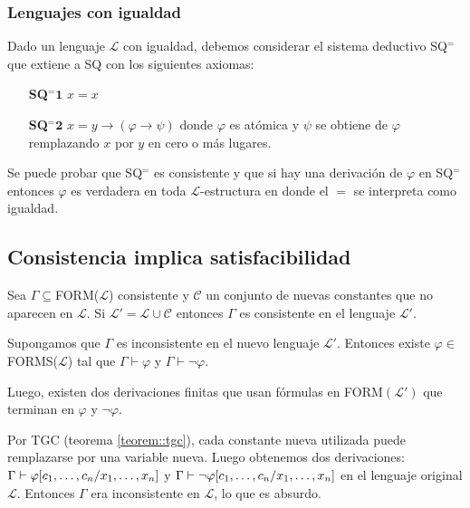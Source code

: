 \subsubsection{Lenguajes con igualdad}
Dado un lenguaje $\mathcal{L}$ con igualdad, debemos considerar el sistema deductivo SQ$^=$ que extiene a SQ con los siguientes axiomas:

\begin{itemize}
	\item[\textbf{SQ}$\bm{^=1}$] $x = x$
	\item[\textbf{SQ}$\bm{^=2}$] $x = y\to(\varphi\to\psi)$ donde $\varphi$ es atómica y $\psi$ se obtiene de $\varphi$ remplazando $x$ por $y$ en cero o más lugares.
\end{itemize}

Se puede probar que SQ$^=$ es consistente y que si hay una derivación de $\varphi$ en SQ$^=$ entonces $\varphi$ es verdadera en toda $\mathcal{L}$-estructura en donde el $=$ se interpreta como igualdad.

\subsection{Consistencia implica satisfacibilidad}

\begin{teorema}
	Sea $\Gamma\subseteq$FORM($\mathcal{L}$) consistente y  $\mathcal{C}$ un conjunto de nuevas constantes que no aparecen en $\mathcal{L}$. Si $\mathcal{L}'=\mathcal{L}\cup\mathcal{C}$ entonces $\Gamma$ es consistente en el lenguaje $\mathcal{L}'$.
\end{teorema}

\begin{demo}
	Supongamos que $\Gamma$ es inconsistente en el nuevo lenguaje $\mathcal{L}'$. Entonces existe $\varphi\in$FORMS($\mathcal{L}$) tal que $\Gamma\vdash\varphi$ y $\Gamma\vdash\lnot\varphi$.
	
	Luego, existen dos derivaciones finitas que usan fórmulas en FORM$(\mathcal{L}')$ que terminan en $\varphi$ y $\lnot\varphi$.
	
	Por TGC (teorema \ref{teorem::tgc}), cada constante nueva utilizada puede remplazarse por una variable nueva. Luego obtenemos dos derivaciones: $\Gamma\vdash\varphi[c_1,\dots, c_{n}/x_1,\dots, x_{n}]$ y $\Gamma\vdash\lnot\varphi[c_1,\dots, c_{n}/x_1,\dots, x_{n}]$ en el lenguaje original $\mathcal{L}$. Entonces $\Gamma$ era inconsistente en $\mathcal{L}$, lo que es absurdo.
\end{demo}
	
